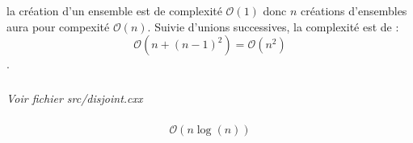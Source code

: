 \documentclass[10pt,a4paper]{article}
\renewcommand{\O}{\mathcal{O}}
\begin{document}
la création d'un ensemble est de complexité $\O(1)$ donc $n$ créations d'ensembles aura pour compexité $\O(n)$. Suivie d'unions successives, la complexité est de :
\[\O(n + (n-1)^2) = \O(n^2)\].

\subsubsection{}


\subsubsection{}
\textit{Voir fichier src/disjoint.cxx}

\subsubsection{}
\[\O(n\log(n))\]
\end{document}

